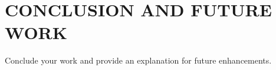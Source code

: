 \chapter{\uppercase{Conclusion and Future Work}}
\label{chap:conclusion}
Conclude your work and provide an explanation for future enhancements.